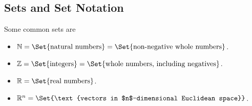 \documentclass{workbook}
\begin{document}
\begin{slide}[+1]

\section*{Sets and Set Notation}
\vspace{-.5cm}


	\begin{definition}
		\raggedright
		Some common sets are
		\begin{itemize}
			\item[] $\N=\Set{\text{natural numbers}} = \Set{\text{non-negative whole numbers}}$.
			\item[] $\Z=\Set{\text{integers}} = \Set{\text{whole numbers, including negatives}}$.
			\item[] $\R=\Set{\text{real numbers}}$.
			\item[] $\R^n=\Set{\text{vectors in $n$-dimensional Euclidean space}}$.
		\end{itemize}
	\end{definition}
\end{slide}
\end{document}
